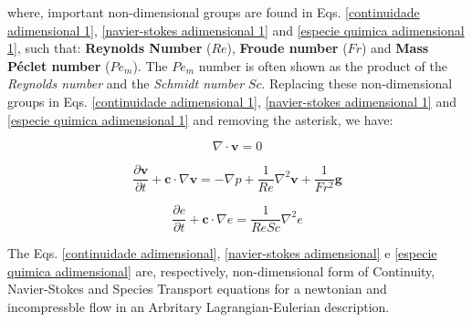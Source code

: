 \noindent
where, important non-dimensional groups are found in
Eqs. \ref{continuidade adimensional 1}, \ref{navier-stokes adimensional 1}
and \ref{especie quimica adimensional 1}, such that:
\textbf{Reynolds Number} ($Re$),
\textbf{Froude number} ($Fr$) and
\textbf{Mass Péclet number} ($Pe_{m}$).
The $Pe_{m}$ number is often
 shown as the product of
 the \textit{Reynolds number} and the \textit{Schmidt number} $Sc$.
Replacing these non-dimensional groups in Eqs.
\ref{continuidade adimensional 1}, \ref{navier-stokes adimensional 1}
and \ref{especie quimica adimensional 1} and
removing the asterisk, we have:

\begin{equation} \label{continuidade adimensional}
 \nabla \cdot \textbf{v} = 0
\end{equation}

\begin{equation} \label{navier-stokes adimensional}
 \frac{\partial \textbf{v}}{\partial t} 
 + 
 \textbf{c} \cdot \nabla \textbf{v}
 =
 -
 \nabla p
 +
 \frac{1}{Re} \nabla^{2} \textbf{v}
 +
 \frac{1}{Fr^{2}} \textbf{g}
\end{equation}

\begin{equation} \label{especie quimica adimensional}
 \frac{\partial e}{\partial t}
 +
 \textbf{c} \cdot \nabla e
 =
 \frac{1}{ReSc} \nabla^{2} e
\end{equation}

\medskip
The Eqs.
\ref{continuidade adimensional}, 
\ref{navier-stokes adimensional} e 
\ref{especie quimica adimensional}
are, respectively, non-dimensional form of Continuity,
Navier-Stokes and Species Transport equations
for a newtonian and incompressble flow in an
Arbritary Lagrangian-Eulerian description.

